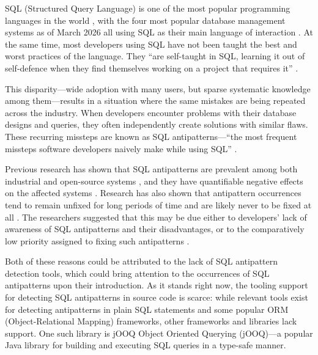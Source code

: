 SQL (Structured Query Language) is one of the most popular programming languages in the world , with the four most popular database management systems as of March 2026 all using SQL as their main language of interaction . At the same time, most developers using SQL have not been taught the best and worst practices of the language. They “are self-taught in SQL, learning it out of self-defence when they find themselves working on a project that requires it” .

This disparity—wide adoption with many users, but sparse systematic knowledge among them—results in a situation where the same mistakes are being repeated across the industry. When developers encounter problems with their database designs and queries, they often independently create solutions with similar flaws. These recurring missteps are known as SQL antipatterns—“the most frequent missteps software developers naively make while using SQL” .

Previous research has shown that SQL antipatterns are prevalent among both industrial and open-source systems \citetext{\citealp{muse2020prevalence}; \citealp[pp. 59–60]{sharma2018smelly}}, and they have quantifiable negative effects on the affected systems \citetext{\citealp{lyu2019quantifying}; \citealp[pp. 2334–2335]{DBLP:conf/sigmod/DintyalaNA20}}.
Research has also shown that antipattern occurrences tend to remain unfixed for long periods of time and are likely never to be fixed at all . The researchers suggested that this may be due either to developers’ lack of awareness of SQL antipatterns and their disadvantages, or to the comparatively low priority assigned to fixing such antipatterns .

Both of these reasons could be attributed to the lack of SQL antipattern detection tools, which could bring attention to the occurrences of SQL antipatterns upon their introduction. As it stands right now, the tooling support for detecting SQL antipatterns in source code is scarce: while relevant tools exist for detecting antipatterns in plain SQL statements and some popular ORM (Object-Relational Mapping) frameworks, other frameworks and libraries lack support. One such library is jOOQ Object Oriented Querying (jOOQ)—a popular Java library for building and executing SQL queries in a type-safe manner.

